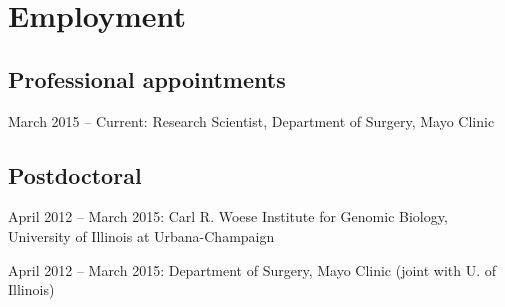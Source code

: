\documentclass[letterpaper]{article}
\renewenvironment{itemize}{
  \begin{list}{}{
    \setlength{\leftmargin}{1.5em}
  }
}{
  \end{list}
}
\begin{document}
\section*{Employment}
\subsection*{Professional appointments}
\begin{itemize}
\item March 2015 -- Current: Research Scientist, Department of Surgery, Mayo Clinic
\end{itemize}
\subsection*{Postdoctoral}
\begin{itemize}
\item April 2012 -- March 2015: Carl R. Woese Institute for Genomic Biology, University of Illinois at Urbana-Champaign
\item April 2012 -- March 2015: Department of Surgery, Mayo Clinic (joint with U. of Illinois)
\end{itemize}
\end{document}
